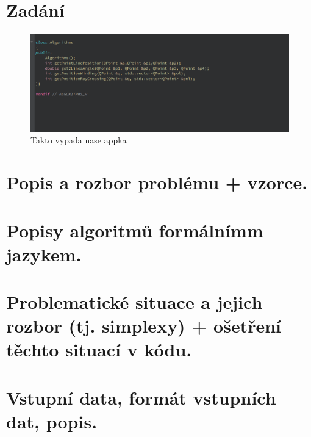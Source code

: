 \documentclass[11pt]{article}
\begin{document}



\tableofcontents

\clearpage

\section{Zadání}

\begin{figure}[htbh]
	\centering
	\includegraphics[scale=0.55]{images/appka.png} 
	\caption{Takto vypada nase appka}
	\label{fig:ostruzna_mapa.}
\end{figure} 

\clearpage

\section{Popis a rozbor problému + vzorce.}
\clearpage

\section{Popisy algoritmů formálnímm jazykem.}
\clearpage

\section{Problematické situace a jejich rozbor (tj. simplexy) + ošetření těchto situací v kódu.}
\clearpage

\section{Vstupní data, formát vstupních dat, popis.}
\clearpage
\end{document}
